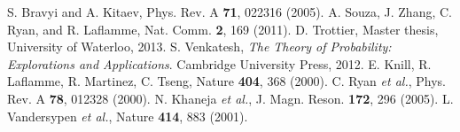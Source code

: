 \documentclass[prl,twocolumn,showpacs]{revtex4-1}
\begin{document}
\begin{thebibliography}{99}
 S. Bravyi and A. Kitaev, Phys. Rev. A \textbf{71}, 022316 (2005).
 A. Souza, J. Zhang, C. Ryan, and R. Laflamme, Nat. Comm. \textbf{2}, 169 (2011).
 D. Trottier, Master thesis, University of Waterloo, 2013.
 S. Venkatesh, \emph{The Theory of Probability: Explorations and Applications}. Cambridge University Press, 2012.
 E. Knill, R. Laflamme, R. Martinez, C. Tseng, Nature \textbf{404}, 368 (2000).
 C. Ryan \emph{et al.}, Phys. Rev. A \textbf{78}, 012328 (2000).
 N. Khaneja \emph{et al.}, J. Magn. Reson. \textbf{172}, 296 (2005).
 L. Vandersypen \emph{et al.}, Nature \textbf{414}, 883 (2001).
\end{thebibliography}
\end{document}
